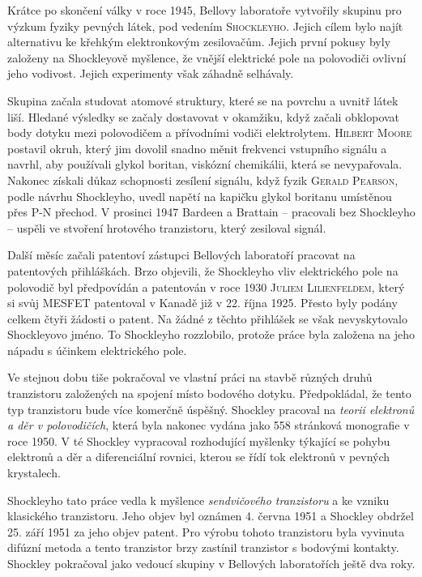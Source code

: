     \begin{mdframed}[style=mdnote]
      \small
      Krátce po skončení války v roce 1945, Bellovy laboratoře vytvořily skupinu pro výzkum fyziky
      pevných látek, pod vedením \textsc{Shockleyho}. Jejich cílem bylo najít alternativu ke křehkým
      elektronkovým zesilovačům. Jejich první pokusy byly založeny na Shockleyově myšlence, že
      vnější elektrické pole na polovodiči ovlivní jeho vodivost. Jejich experimenty však záhadně
      selhávaly.

      Skupina začala studovat atomové struktury, které se na povrchu a uvnitř látek liší. Hledané
      výsledky se začaly dostavovat v okamžiku, když začali obklopovat body dotyku mezi polovodičem
      a přívodními vodiči elektrolytem. \textsc{Hilbert Moore} postavil okruh, který jim dovolil
      snadno měnit frekvenci vstupního signálu a navrhl, aby používali glykol boritan, viskózní
      chemikálii, která se nevypařovala. Nakonec získali důkaz schopnosti zesílení signálu, když
      fyzik \textsc{Gerald Pearson}, podle návrhu Shockleyho, uvedl napětí na kapičku glykol
      boritanu umístěnou přes \textsc{P-N} přechod. V prosinci 1947 Bardeen a Brattain – pracovali
      bez Shockleyho – uspěli ve stvoření hrotového tranzistoru, který zesiloval signál.

      Další měsíc začali patentoví zástupci Bellových laboratoří pracovat na patentových
      přihláškách. Brzo objevili, že Shockleyho vliv elektrického pole na polovodič byl předpovídán
      a patentován v roce 1930 \textsc{Juliem Lilienfeldem}, který si svůj \textsc{MESFET}
      patentoval v Kanadě již v 22. října 1925. Přesto byly podány celkem čtyři žádosti o patent. Na
      žádné z těchto přihlášek se však nevyskytovalo Shockleyovo jméno. To Shockleyho rozzlobilo,
      protože práce byla založena na jeho nápadu s účinkem elektrického pole. 
      
      Ve stejnou dobu tiše pokračoval ve vlastní práci na stavbě různých druhů tranzistoru
      založených na spojení místo bodového dotyku. Předpokládal, že tento typ tranzistoru bude více
      komerčně úspěšný. Shockley pracoval na \emph{teorii elektronů a děr v polovodičích}, která
      byla nakonec vydána jako 558 stránková monografie v roce 1950. V té Shockley vypracoval
      rozhodující myšlenky týkající se pohybu elektronů a děr a diferenciální rovnici, kterou se
      řídí tok elektronů v pevných krystalech.

      Shockleyho tato práce vedla k myšlence \emph{sendvičového tranzistoru} a ke vzniku klasického
      tranzistoru. Jeho objev byl oznámen 4. června 1951 a Shockley obdržel 25. září 1951 za jeho
      objev patent. Pro výrobu tohoto tranzistoru byla vyvinuta difúzní metoda a tento tranzistor
      brzy zastínil tranzistor s bodovými kontakty. Shockley pokračoval jako vedoucí skupiny v
      Bellových laboratořích ještě dva roky.


\end{mdframed}

